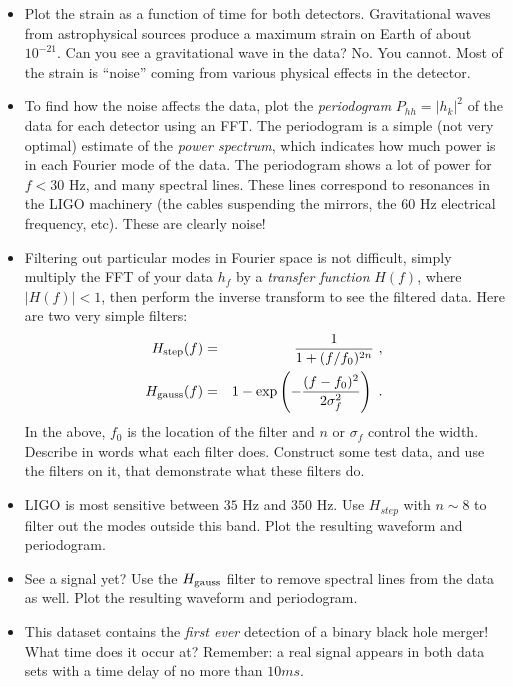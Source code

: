 \documentclass[11pt, preprint]{aastex}
\begin{document}
\begin{itemize}
\item Plot the strain as a function of time for both
  detectors. Gravitational waves from astrophysical sources produce a
  maximum strain on Earth of about $10^{-21}$. Can you see a
  gravitational wave in the data?  No.  You cannot.  Most of the
  strain is ``noise'' coming from various physical effects in the
  detector.
\item To find how the noise affects the data, plot the
  \emph{periodogram} $P_{hh} = |h_k|^2$ of the data for each detector
  using an FFT.  The periodogram is a simple (not very optimal)
  estimate of the \emph{power spectrum}, which indicates how much
  power is in each Fourier mode of the data.  The periodogram shows a
  lot of power for $f < 30$ Hz, and many spectral lines.  These lines
  correspond to resonances in the LIGO machinery (the cables
  suspending the mirrors, the 60 Hz electrical frequency, etc). These
  are clearly noise!
\item Filtering out particular modes in Fourier space is not
  difficult, simply multiply the FFT of your data $h_f$ by a
  \emph{transfer function} $H(f)$, where $|H(f)| < 1$, then perform
  the inverse transform to see the filtered data.  Here are two very
  simple filters:
\begin{eqnarray}
	H_{\rm step}(f) &=& \frac{1}{1+(f/f_0)^{2n}} \ , \\
	H_{\rm gauss}(f) &=& 1 - \exp\left(-\frac{(f-f_0)^2}{2\sigma_f^2}\right) \ .
\end{eqnarray}
In the above, $f_0$ is the location of the filter and $n$ or
$\sigma_f$ control the width. Describe in words what each filter
does. Construct some test data, and use the filters on it, that
demonstrate what these filters do.
\item LIGO is most sensitive between $35$ Hz and $350$ Hz. Use
  $H_{step}$ with $n\sim8$ to filter out the modes outside this band.
  Plot the resulting waveform and periodogram.
\item See a signal yet? Use the $H_{\rm gauss}$ filter to remove spectral
  lines from the data as well.  Plot the resulting waveform and
  periodogram.
\item This dataset contains the \emph{first ever} detection of a
  binary black hole merger!  What time does it occur at?  Remember: a
  real signal appears in both data sets with a time delay of no more
  than $10 ms$.
\end{itemize}
\end{document}
